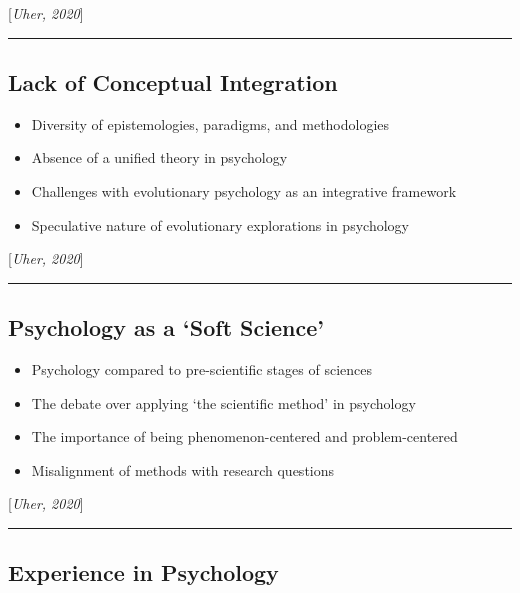 \documentclass[
  letterpaper,
  DIV=11,
  numbers=noendperiod]{scrartcl}
\providecommand{\tightlist}{%
  \setlength{\itemsep}{0pt}\setlength{\parskip}{0pt}}\usepackage{longtable,booktabs,array}
\begin{document}
{[}\emph{Uher, 2020}{]}

\begin{center}\rule{0.5\linewidth}{0.5pt}\end{center}

\subsection{Lack of Conceptual
Integration}\label{lack-of-conceptual-integration}

\begin{itemize}
\tightlist
\item
  Diversity of epistemologies, paradigms, and methodologies
\item
  Absence of a unified theory in psychology
\item
  Challenges with evolutionary psychology as an integrative framework
\item
  Speculative nature of evolutionary explorations in psychology
\end{itemize}

{[}\emph{Uher, 2020}{]}

\begin{center}\rule{0.5\linewidth}{0.5pt}\end{center}

\subsection{Psychology as a `Soft
Science'}\label{psychology-as-a-soft-science-1}

\begin{itemize}
\tightlist
\item
  Psychology compared to pre-scientific stages of sciences
\item
  The debate over applying `the scientific method' in psychology
\item
  The importance of being phenomenon-centered and problem-centered
\item
  Misalignment of methods with research questions
\end{itemize}

{[}\emph{Uher, 2020}{]}

\begin{center}\rule{0.5\linewidth}{0.5pt}\end{center}

\subsection{Experience in Psychology}\label{experience-in-psychology}
\end{document}
